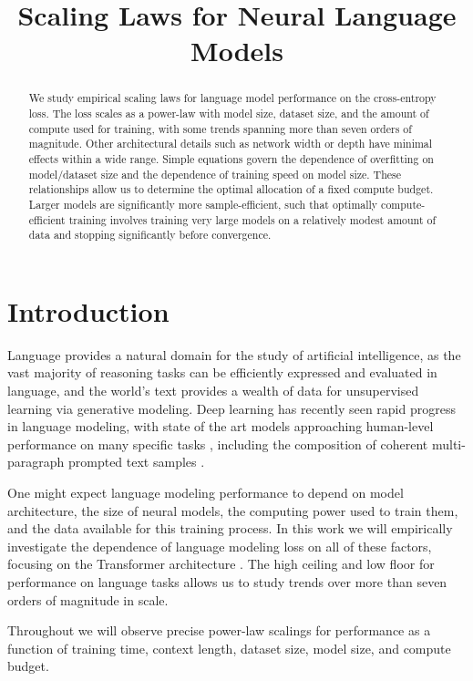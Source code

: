 \title{Scaling Laws for Neural Language Models}

\begin{abstract}
We study empirical scaling laws for language model performance on the cross-entropy loss. The loss scales as a power-law with model size, dataset size, and the amount of compute used for training, with some trends spanning more than seven orders of magnitude. Other architectural details such as network width or depth have minimal effects within a wide range. Simple equations govern the dependence of overfitting on model/dataset size and the dependence of training speed on model size. These relationships allow us to determine the optimal allocation of a fixed compute budget. Larger models are significantly more sample-efficient, such that optimally compute-efficient training involves training very large models on a relatively modest amount of data and stopping significantly before convergence.
\end{abstract}

\section{Introduction}

Language provides a natural domain for the study of artificial intelligence, as the vast majority of reasoning tasks can be efficiently expressed and evaluated in language, and the world's text provides a wealth of data for unsupervised learning via generative modeling.  Deep learning has recently seen rapid progress in language modeling, with state of the art models \cite{radford2018improving,1810.04805,1906.08237,DBLP:journals/corr/abs-1907-11692, 1910.10683} approaching human-level performance on many specific tasks \cite{wang2019superglue}, including the composition of coherent multi-paragraph prompted text samples \cite{radford2019language}.

One might expect language modeling performance to depend on model architecture, the size of neural models, the computing power used to train them, and the data available for this training process.  In this work we will empirically investigate the dependence of language modeling loss on all of these factors, focusing on the Transformer architecture \cite{OriginalTransformer,liu2018generating}.  The high ceiling and low floor for performance on language tasks allows us to study trends over more than seven orders of magnitude in scale.

Throughout we will observe precise power-law scalings for performance as a function of training time, context length, dataset size, model size, and compute budget.  

